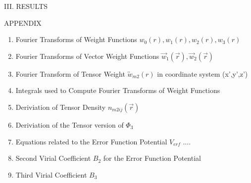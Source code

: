 \documentclass[12pt]{article}
\begin{document}
\[{}\]
\[{}\]
\[{}\]
\[{}\]
\[{}\]
\[{}\]
III. RESULTS
\[{}\]
\[{}\]
\[{}\]
\[{}\]
\[{}\]
\[{}\]
\[{}\]
\[{}\]



APPENDIX
\begin{enumerate}

\item Fourier Transforms of Weight Functions $w_0(r), w_1(r), w_2(r), w_3(r)$
\item Fourier Transforms of Vector Weight Functions $\vec{w}_1(\vec{r}), \vec{w}_2(\vec{r})$  
\item Fourier Transform of Tensor Weight $\overleftrightarrow{w}_{m2}(r)$ in coordinate system (x',y',z')
\item Integrals used to Compute Fourier Transforms of Weight Functions
\item Deriviation of Tensor Density $n_{m2ij}(\vec{r})$ 
\item Deriviation of the Tensor version of $\Phi_3$ 
\item Equations related to the Error Function Potential $V_{erf}$ ....
\item Second Virial Coefficient $B_{2}$ for the Error Function Potential 
\item Third Virial Coefficient $B_{3}$
\end{enumerate}
\end{document}
